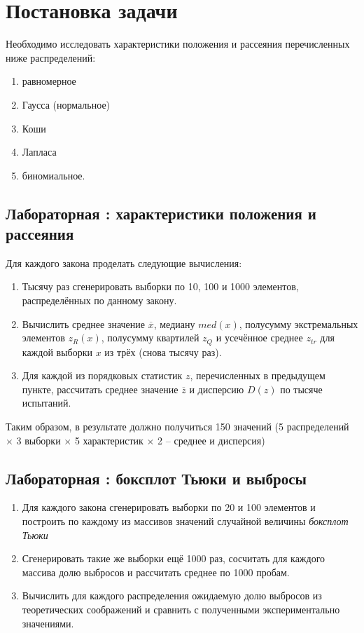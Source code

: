 \documentclass[zuev_report2.tex]{subfiles}
\begin{document}
\section{Постановка задачи}
Необходимо исследовать характеристики положения и рассеяния перечисленных ниже распределений:
\begin{enumerate}
	\item равномерное
	\item Гаусса (нормальное)
	\item Коши
	\item Лапласа
	\item биномиальное.
\end{enumerate}
\subsection{Лабораторная : характеристики положения и рассеяния}
Для каждого закона проделать следующие вычисления:
\begin{enumerate}
	\item Тысячу раз сгенерировать выборки по 10, 100 и 1000 элементов, распределённых по данному закону.
	\item Вычислить среднее значение $\overline{x}$, медиану $med(x)$, полусумму экстремальных элементов $z_R(x)$, полусумму квартилей $z_Q$ и усечённое среднее $z_{tr}$ для каждой выборки $x$ из трёх (снова тысячу раз).
	\item Для каждой из порядковых статистик $z$, перечисленных в предыдущем пункте, рассчитать среднее значение $\overline{z}$ и дисперсию $D(z)$ по тысяче испытаний.
\end{enumerate}
Таким образом, в результате должно получиться 150 значений (5 распределений $\times$ 3 выборки $\times$ 5 характеристик $\times$ 2 -- среднее и дисперсия)

\subsection{Лабораторная : боксплот Тьюки и выбросы}
\begin{enumerate}
	\item Для каждого закона сгенерировать выборки по 20 и 100 элементов и построить по каждому из массивов значений случайной величины \textit{боксплот Тьюки}
	\item Сгенерировать такие же выборки ещё 1000 раз, сосчитать для каждого массива долю выбросов и рассчитать среднее по 1000 пробам.
	\item Вычислить для каждого распределения ожидаемую долю выбросов из теоретических соображений и сравнить с полученными экспериментально значениями.
\end{enumerate}
\newpage
\end{document}
